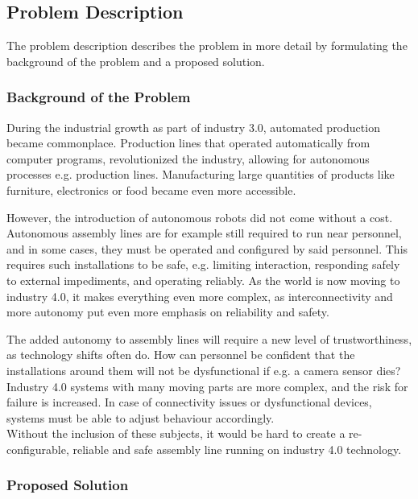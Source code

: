 \subsection{Problem Description}

The problem description describes the problem in more detail by formulating the background of the problem and a proposed solution.

\subsubsection{Background of the Problem}\hfill

During the industrial growth as part of industry 3.0, automated production became commonplace. Production lines that operated automatically from computer programs, revolutionized the industry, allowing for autonomous processes e.g. production lines. Manufacturing large quantities of products like furniture, electronics or food became even more accessible. \cite{industrial-revolutions}

However, the introduction of autonomous robots did not come without a cost. Autonomous assembly lines are for example still required to run near personnel, and in some cases, they must be operated and configured by said personnel. This requires such installations to be safe, e.g. limiting interaction, responding safely to external impediments, and operating reliably. As the world is now moving to industry 4.0, it makes everything even more complex, as interconnectivity and more autonomy put even more emphasis on reliability and safety. \cite[ch. 6]{se-robotics}

The added autonomy to assembly lines will require a new level of trustworthiness, as technology shifts often do. How can personnel be confident that the installations around them will not be dysfunctional if e.g. a camera sensor dies? Industry 4.0 systems with many moving parts are more complex, and the risk for failure is increased. In case of connectivity issues or dysfunctional devices, systems must be able to adjust behaviour accordingly. \cite[ch. 5]{se-robotics}\\

Without the inclusion of these subjects, it would be hard to create a re-configurable, reliable and safe assembly line running on industry 4.0 technology.

\subsubsection{Proposed Solution}\hfill

